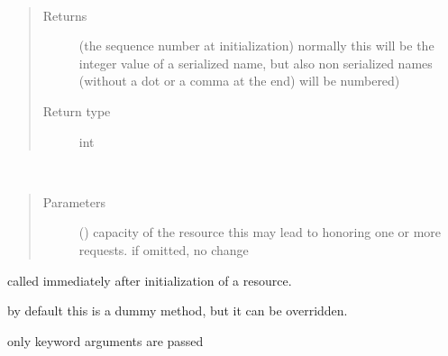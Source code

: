 \documentclass[letterpaper,10pt,english]{sphinxmanual}
\begin{document}
\begin{fulllineitems}
\begin{fulllineitems}
\end{fulllineitems}


\begin{fulllineitems}
\label{\detokenize{Reference:salabim.Resource.sequence_number}}~\begin{quote}\begin{description}
\item[{Returns}] \leavevmode
{} \textendash{} (the sequence number at initialization) 
normally this will be the integer value of a serialized name,
but also non serialized names (without a dot or a comma at the end)
will be numbered)

\item[{Return type}] \leavevmode
int

\end{description}\end{quote}

\end{fulllineitems}


\begin{fulllineitems}
\label{\detokenize{Reference:salabim.Resource.set_capacity}}~\begin{quote}\begin{description}
\item[{Parameters}] \leavevmode
{} () \textendash{} capacity of the resource 
this may lead to honoring one or more requests. 
if omitted, no change

\end{description}\end{quote}

\end{fulllineitems}


\begin{fulllineitems}
\label{\detokenize{Reference:salabim.Resource.setup}}
called immediately after initialization of a resource.

by default this is a dummy method, but it can be overridden.

only keyword arguments are passed

\end{fulllineitems}


\end{fulllineitems}
\end{document}
